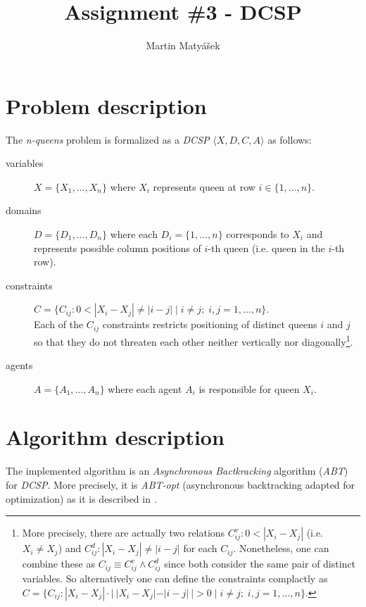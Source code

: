 \documentclass[11pt]{article}
\title{Assignment \#3 - DCSP}
\author{Martin Matyášek}
\begin{document}
\maketitle

\section{Problem description}
The \emph{n-queens} problem is formalized as a \emph{DCSP} $\langle X, D, C, A \rangle$ as follows:
\begin{description}
\item[variables] $X = \{X_1, \dots, X_n\}$ where $X_i$ represents queen at row $i \in \{1, \dots, n\}$.
\item[domains] $D = \{D_1, \dots, D_n\}$ where each $D_i = \{1, \dots, n\}$ corresponds to $X_i$ and represents possible column positions of $i$-th queen (i.e. queen in the $i$-th row).
\item[constraints] $C = \{C_{ij}: 0 < |X_i - X_j| \neq |i - j| \; | \; i \neq j; \; i, j = 1, \dots, n\}$. \\ Each of the $C_{ij}$ constraints restricts positioning of distinct queens $i$ and $j$ so that they do not threaten each other neither vertically nor diagonally\footnote{More precisely, there are actually two relations $C_{ij}^v : 0 < |X_i - X_j|$ (i.e. $X_i \neq X_j$) and $C_{ij}^d : |X_i - X_j| \neq |i - j|$ for each $C_{ij}$. Nonetheless, one can combine these as $C_{ij} \equiv C_{ij}^v \land C_{ij}^d$ since both consider the same pair of distinct variables. So alternatively one can define the constraints complactly as $C = \{C_{ij}: |X_i - X_j| \cdot | \: |X_i - X_j| - |i - j| \: | > 0 \; | \; i \neq j; \; i, j = 1, \dots, n\}$.}.
\item[agents] $A = \{A_1, \dots, A_n\}$ where each agent $A_i$ is responsible for queen $X_i$.
\end{description}

\section{Algorithm description}
The implemented algorithm is an \emph{Asynchronous Bactkracking} algorithm (\emph{ABT}) for \emph{DCSP}. More precisely, it is \emph{ABT-opt} (asynchronous backtracking adapted for optimization) as it is described in \cite{rossi2006handbook}.
\end{document}
